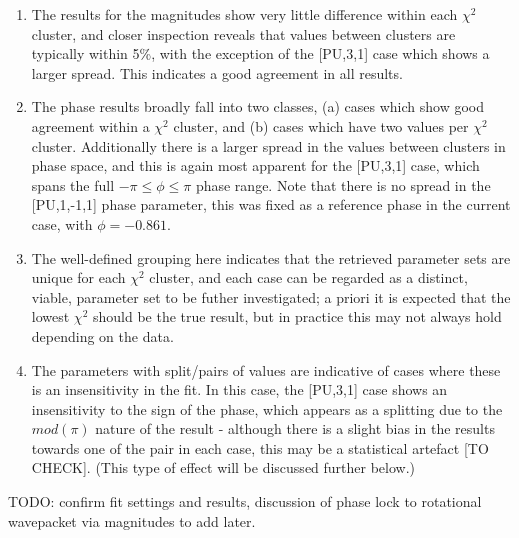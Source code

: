 \begin{enumerate}
\item The results for the magnitudes show very little difference within each $\chi^2$ cluster, and closer inspection reveals that values between clusters are typically within 5\%, with the exception of the [PU,3,1] case which shows a larger spread. This indicates a good agreement in all results.
\item The phase results broadly fall into two classes, (a) cases which show good agreement within a $\chi^2$ cluster, and (b) cases which have two values per $\chi^2$ cluster. Additionally there is a larger spread in the values between clusters in phase space, and this is again most apparent for the [PU,3,1] case, which spans the full $-\pi\leq\phi\leq\pi$ phase range. Note that there is no spread in the [PU,1,-1,1] phase parameter, this was fixed as a reference phase in the current case, with $\phi=-0.861$.
\item The well-defined grouping here indicates that the retrieved parameter sets are unique for each $\chi^2$ cluster, and each case can be regarded as a distinct, viable, parameter set to be futher investigated; a priori it is expected that the lowest $\chi^2$ should be the true result, but in practice this may not always hold depending on the data.
\item The parameters with split/pairs of values are indicative of cases where these is an insensitivity in the fit. In this case, the [PU,3,1] case shows an insensitivity to the sign of the phase, which appears as a splitting due to the $mod(\pi)$ nature of the result - although there is a slight bias in the results towards one of the pair in each case, this may be a statistical artefact [TO CHECK]. (This type of effect will be discussed further below.)
\end{enumerate}

TODO: confirm fit settings and results, discussion of phase lock to rotational wavepacket via magnitudes to add later.

